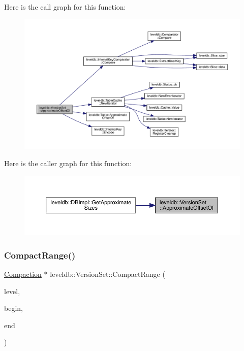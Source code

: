 Here is the call graph for this function\+:
\nopagebreak
\begin{figure}[H]
\begin{center}
\leavevmode
\includegraphics[width=350pt]{classleveldb_1_1_version_set_ada7f3ed63b1c48adb6e5b38348b300e1_cgraph}
\end{center}
\end{figure}
Here is the caller graph for this function\+:
\nopagebreak
\begin{figure}[H]
\begin{center}
\leavevmode
\includegraphics[width=350pt]{classleveldb_1_1_version_set_ada7f3ed63b1c48adb6e5b38348b300e1_icgraph}
\end{center}
\end{figure}
\mbox{\label{classleveldb_1_1_version_set_a3a03f9a6c86e861be314cf8e01f33142}} 
\subsubsection{\texorpdfstring{CompactRange()}{CompactRange()}}
{\footnotesize\ttfamily \mbox{\hyperlink{classleveldb_1_1_compaction}{Compaction}} $\ast$ leveldb\+::\+Version\+Set\+::\+Compact\+Range (\begin{DoxyParamCaption}\item[{int}]{level,  }\item[{const \mbox{\hyperlink{classleveldb_1_1_internal_key}{Internal\+Key}} $\ast$}]{begin,  }\item[{const \mbox{\hyperlink{classleveldb_1_1_internal_key}{Internal\+Key}} $\ast$}]{end }\end{DoxyParamCaption})}

